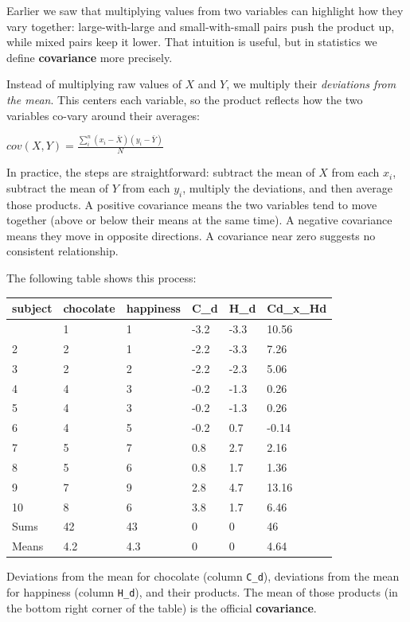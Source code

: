 \documentclass[
  letterpaper,
  DIV=11,
  numbers=noendperiod]{scrreprt}
\begin{document}
Earlier we saw that multiplying values from two variables can highlight
how they vary together: large-with-large and small-with-small pairs push
the product up, while mixed pairs keep it lower. That intuition is
useful, but in statistics we define \textbf{covariance} more precisely.

Instead of multiplying raw values of \(X\) and \(Y\), we multiply their
\emph{deviations from the mean}. This centers each variable, so the
product reflects how the two variables co-vary around their averages:

\(cov(X,Y) = \frac{\sum_{i}^{n}(x_{i}-\bar{X})(y_{i}-\bar{Y})}{N}\)

In practice, the steps are straightforward: subtract the mean of \(X\)
from each \(x_i\), subtract the mean of \(Y\) from each \(y_i\),
multiply the deviations, and then average those products. A positive
covariance means the two variables tend to move together (above or below
their means at the same time). A negative covariance means they move in
opposite directions. A covariance near zero suggests no consistent
relationship.

The following table shows this process:

\begin{longtable}[]{@{}llllll@{}}
\toprule\noalign{}
subject & chocolate & happiness & C\_d & H\_d & Cd\_x\_Hd \\
\midrule\noalign{}
\endhead
\bottomrule\noalign{}
\endlastfoot
1 & 1 & 1 & -3.2 & -3.3 & 10.56 \\
2 & 2 & 1 & -2.2 & -3.3 & 7.26 \\
3 & 2 & 2 & -2.2 & -2.3 & 5.06 \\
4 & 4 & 3 & -0.2 & -1.3 & 0.26 \\
5 & 4 & 3 & -0.2 & -1.3 & 0.26 \\
6 & 4 & 5 & -0.2 & 0.7 & -0.14 \\
7 & 5 & 7 & 0.8 & 2.7 & 2.16 \\
8 & 5 & 6 & 0.8 & 1.7 & 1.36 \\
9 & 7 & 9 & 2.8 & 4.7 & 13.16 \\
10 & 8 & 6 & 3.8 & 1.7 & 6.46 \\
Sums & 42 & 43 & 0 & 0 & 46 \\
Means & 4.2 & 4.3 & 0 & 0 & 4.64 \\
\end{longtable}

Deviations from the mean for chocolate (column \texttt{C\_d}),
deviations from the mean for happiness (column \texttt{H\_d}), and their
products. The mean of those products (in the bottom right corner of the
table) is the official \textbf{covariance}.
\end{document}
